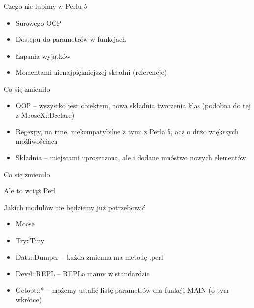 \documentclass{beamer}
\begin{document}
\begin{frame}{Czego nie lubimy w Perlu 5}
	\begin{itemize}
		\item Surowego OOP
		\item Dostępu do parametrów w funkcjach
		\item Łapania wyjątków
		\item Momentami nienajpiękniejszej składni (referencje)
	\end{itemize}
\end{frame}

\begin{frame}{Co się zmieniło}
	\begin{itemize}
		\item OOP -- wszystko jest obiektem, nowa składnia
			tworzenia klas (podobna do tej z MooseX::Declare)
		\item Regexpy, na inne, niekompatybilne z tymi z Perla 5,
			acz o dużo większych możliwościach
		\item Składnia -- miejscami uproszczona,
			ale i dodane mnóstwo nowych elementów
	\end{itemize}
\end{frame}

\begin{frame}[fragile]{Co się zmieniło}
	\begin{center}
		{\Huge Ale to wciąż Perl}
	\end{center}
\end{frame}

\begin{frame}[fragile]{Jakich modułów nie będziemy już potrzebować}
	\begin{itemize}
		\item Moose
		\item Try::Tiny
		\item Data::Dumper -- każda zmienna ma metodę .perl
		\item Devel::REPL -- REPLa mamy w standardzie
		\item Getopt::* -- możemy ustalić listę parametrów
			dla funkcji MAIN (o tym wkrótce) %
	\end{itemize}
\end{frame}
\end{document}
